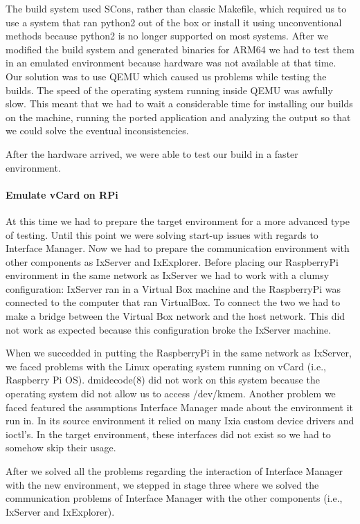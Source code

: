 The build system used SCons, rather than classic Makefile, which required us to
use a system that ran python2 out of the box or install it using unconventional
methods because python2 is no longer supported on most systems. After we
modified the build system and generated binaries for ARM64 we had to test them
in an emulated environment because hardware was not available at that time. Our
solution was to use QEMU which caused us problems while testing the builds.
The speed of the operating system running inside QEMU was awfully slow. This
meant that we had to wait a considerable time for installing our builds on the
machine, running the ported application and analyzing the output so that we
could solve the eventual inconsistencies.

After the hardware arrived, we were able to test our build in a faster
environment.

\paragraph{Emulate vCard on RPi}

At this time we had to prepare the target environment for a more advanced
type of testing. Until this point we were solving start-up issues with regards
to Interface Manager. Now we had to prepare the communication environment with
other components as IxServer and IxExplorer. Before placing our RaspberryPi
environment in the same network as IxServer we had to work with a clumsy
configuration: IxServer ran in a Virtual Box machine and the RaspberryPi was
connected to the computer that ran VirtualBox. To connect the two we had to make
a bridge between the Virtual Box network and the host network. This did not work
as expected because this configuration broke the IxServer machine.

When we succedded in putting the RaspberryPi in the same network as IxServer,
we faced problems with the Linux operating system running on vCard (i.e.,
Raspberry Pi OS). dmidecode(8) did not work on this system because the operating
system did not allow us to access /dev/kmem. Another problem we faced featured
the assumptions Interface Manager made about the environment it run in. In its
source environment it relied on many Ixia custom device drivers and ioctl's.
In the target environment, these interfaces did not exist so we had to somehow
skip their usage.

After we solved all the problems regarding the interaction of Interface Manager
with the new environment, we stepped in stage three where we solved the
communication problems of Interface Manager with the other components (i.e.,
IxServer and IxExplorer).

